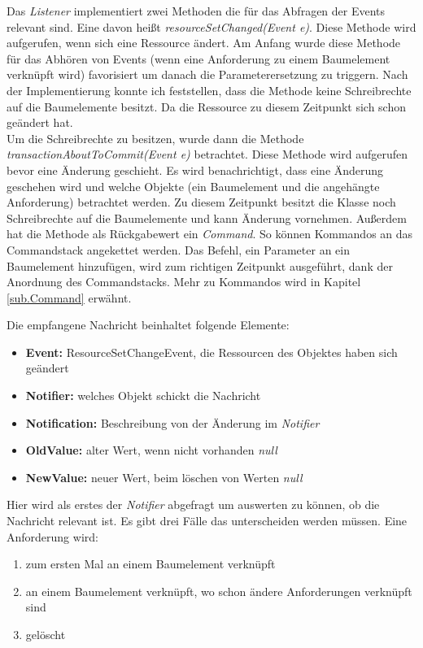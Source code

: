Das \textit{Listener} implementiert zwei Methoden die für das Abfragen der Events relevant sind. Eine davon heißt \textit{resourceSetChanged(Event e)}. Diese Methode wird aufgerufen, wenn sich eine Ressource ändert. Am Anfang wurde diese Methode  für das Abhören von Events (wenn eine Anforderung zu einem Baumelement verknüpft wird) favorisiert um danach die Parameterersetzung zu triggern. Nach der Implementierung konnte ich feststellen, dass die Methode keine Schreibrechte auf die Baumelemente besitzt. Da die Ressource zu diesem Zeitpunkt sich schon geändert hat.\\


Um die Schreibrechte zu besitzen, wurde dann die Methode \textit{transactionAboutToCommit(Event e)} betrachtet. Diese Methode wird aufgerufen bevor eine Änderung geschieht. Es wird benachrichtigt, dass eine Änderung geschehen wird und welche Objekte (ein Baumelement und die angehängte Anforderung) betrachtet werden. Zu diesem Zeitpunkt besitzt die Klasse noch Schreibrechte auf die Baumelemente und kann Änderung vornehmen. Außerdem hat die Methode als Rückgabewert ein \textit{Command}. So können Kommandos an das Commandstack angekettet werden. Das Befehl, ein Parameter an ein Baumelement hinzufügen, wird zum richtigen Zeitpunkt ausgeführt, dank der Anordnung des Commandstacks. Mehr zu Kommandos wird in Kapitel \ref{sub.Command} erwähnt.


Die empfangene Nachricht beinhaltet folgende Elemente: 

\begin{itemize}
\item \textbf{Event: }ResourceSetChangeEvent, die Ressourcen des Objektes haben sich geändert
\item \textbf{Notifier: } welches Objekt schickt die Nachricht
\item \textbf{Notification: }Beschreibung von der Änderung im \textit{Notifier}
\item \textbf{OldValue: } alter Wert, wenn nicht vorhanden \textit{null}
\item \textbf{NewValue: } neuer Wert, beim löschen von Werten \textit{null}
\end{itemize}


Hier wird als erstes der \textit{Notifier} abgefragt um auswerten zu können, ob die Nachricht relevant ist. Es gibt drei Fälle das unterscheiden werden müssen. Eine Anforderung wird:


\begin{enumerate}
\item zum ersten Mal an einem Baumelement verknüpft
\item an einem Baumelement verknüpft, wo schon ändere Anforderungen verknüpft sind
\item gelöscht
\end{enumerate}


